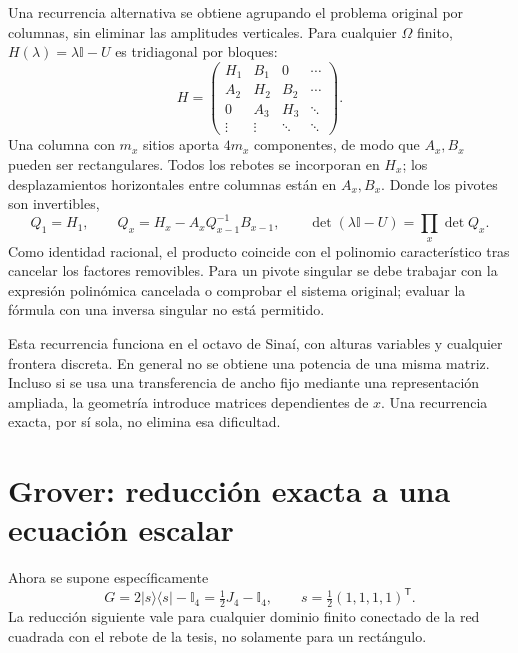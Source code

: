 \documentclass[11pt,a4paper]{article}
\newcommand{\ket}[1]{\lvert #1\rangle}
\newcommand{\bra}[1]{\langle #1\rvert}
\newcommand{\Id}{\mathbb I}
\numberwithin{equation}{section}
\begin{document}
Una recurrencia alternativa se obtiene agrupando el problema original por columnas, sin eliminar las amplitudes verticales. Para cualquier $\Omega$ finito, $H(\lambda)=\lambda\Id-U$ es tridiagonal por bloques:
\begin{equation}
 H=\begin{pmatrix}
 H_1&B_1&0&\cdots\\
 A_2&H_2&B_2&\cdots\\
 0&A_3&H_3&\ddots\\
 \vdots&\vdots&\ddots&\ddots
 \end{pmatrix}.
\end{equation}
Una columna con $m_x$ sitios aporta $4m_x$ componentes, de modo que $A_x,B_x$ pueden ser rectangulares. Todos los rebotes se incorporan en $H_x$; los desplazamientos horizontales entre columnas están en $A_x,B_x$. Donde los pivotes son invertibles,
\begin{equation}\label{eq:schur}
 Q_1=H_1,\qquad Q_x=H_x-A_xQ_{x-1}^{-1}B_{x-1},\qquad
 \boxed{\det(\lambda\Id-U)=\prod_x\det Q_x.}
\end{equation}
Como identidad racional, el producto coincide con el polinomio característico tras cancelar los factores removibles. Para un pivote singular se debe trabajar con la expresión polinómica cancelada o comprobar el sistema original; evaluar la fórmula con una inversa singular no está permitido.

Esta recurrencia funciona en el octavo de Sinaí, con alturas variables y cualquier frontera discreta. En general no se obtiene una potencia de una misma matriz. Incluso si se usa una transferencia de ancho fijo mediante una representación ampliada, la geometría introduce matrices dependientes de $x$. Una recurrencia exacta, por sí sola, no elimina esa dificultad.

\section{Grover: reducción exacta a una ecuación escalar}
Ahora se supone específicamente
\begin{equation}\label{eq:grover}
 G=2\ket{s}\!\bra{s}-\Id_4=\tfrac12J_4-\Id_4,
 \qquad s=\tfrac12(1,1,1,1)^{\mathsf T}.
\end{equation}
La reducción siguiente vale para cualquier dominio finito conectado de la red cuadrada con el rebote de la tesis, no solamente para un rectángulo.
\end{document}
